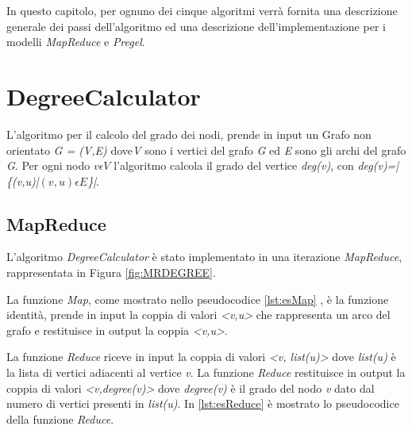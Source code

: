 \documentclass[LaM,binding=0.6cm]{sapthesis}
\begin{document}
In questo capitolo, per ognuno dei cinque algoritmi verrà fornita una descrizione generale dei passi dell'algoritmo ed una descrizione dell'implementazione per i modelli \textit{MapReduce} e \textit{Pregel}.



\section{DegreeCalculator}

L'algoritmo per il calcolo del grado dei nodi, prende in input un Grafo non orientato \textit{G = (V,E)} dove\textit {V} sono i vertici del grafo \textit{G} ed \textit{E} sono gli archi del grafo \textit{G}. Per ogni nodo \textit{$v \epsilon V$} l'algoritmo calcola il grado del vertice \textit{deg(v)}, con  \textit{deg(v)=|\{(v,u)|$(v,u) \epsilon E$\}|}.

\subsection{MapReduce}

L'algoritmo \textit{DegreeCalculator} è stato implementato in una iterazione \textit{MapReduce}, rappresentata in Figura \ref{fig:MRDEGREE}.

La funzione \textit{Map}, come mostrato nello pseudocodice \ref{lst:esMap} , è la funzione identità, prende in input la coppia di valori \textit{<v,u>} che rappresenta un arco del grafo e restituisce in output la coppia \textit{<v,u>}.

La funzione \textit{Reduce} riceve in input la coppia di valori \textit{<v, list(u)>} dove \textit{list(u)} è la lista  di vertici adiacenti al vertice \textit{v}. La funzione \textit{Reduce} restituisce in output la coppia di valori \textit{<v,degree(v)>} dove \textit{degree(v)} è il grado del nodo \textit{v} dato dal numero di vertici presenti in \textit{list(u)}. In \ref{lst:esReduce} è mostrato lo pseudocodice della funzione \textit{Reduce}.

\begin{minipage}{\linewidth}

\end{minipage}
\begin{minipage}{\linewidth}

\end{minipage}
\end{document}

